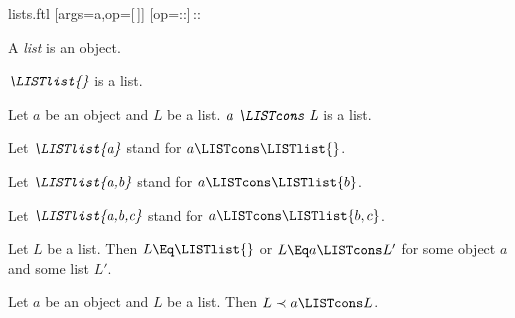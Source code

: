 \documentclass{stex}
\begin{document}
\begin{smodule}{lists.ftl}
[args=a,op=[\,]]{}
[op=::]{\,{::}\,}

\begin{signature}[forthel,id=LISTS_LISTS_4578620297183232]
  A \emph{list} is an object.
\end{signature}

\begin{signature}[forthel,id=LISTS_LISTS_3703161885818880]
  $\emph{\LISTlist{}}$ is a list.
\end{signature}

\begin{signature}[forthel,id=LISTS_LISTS_8050301789536256]
  Let $a$ be an object and $L$ be a list.
  $\emph{a \LISTcons L}$ is a list.

  Let $\emph{\LISTlist{a}}$ stand for $a \LISTcons \LISTlist{}$.
  
  Let $\emph{\LISTlist{a,b}}$ stand for $a \LISTcons \LISTlist{b}$.
  
  Let $\emph{\LISTlist{a,b,c}}$ stand for $a \LISTcons \LISTlist{b,c}$.
\end{signature}

\begin{axiom}[forthel,id=LISTS_LISTS_4512036658964875]
  Let $L$ be a list.
  Then $L \Eq \LISTlist{}$ or $L \Eq a \LISTcons L'$ for some object $a$ and some list $L'$.
\end{axiom}

\begin{axiom}[forthel,id=LISTS_LISTS_1021563255448756]
  Let $a$ be an object and $L$ be a list.
  Then $L \prec a \LISTcons L$.
\end{axiom}
\end{smodule}
\end{document}
